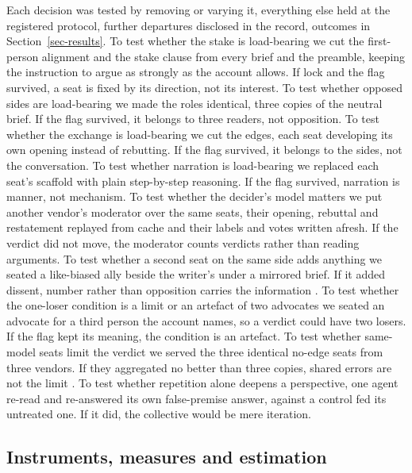 Each decision was tested by removing or varying it, everything else held
at the registered protocol, further departures disclosed in the record,
outcomes in
Section~\ref{sec-results}.
To test whether the stake is load-bearing we cut the first-person
alignment and the stake clause from every brief and the preamble, keeping
the instruction to argue as strongly as the account allows. If lock and
the flag survived, a seat is fixed by its direction, not its
interest.
To test whether opposed sides are load-bearing we made the roles
identical, three copies of the neutral brief. If the flag survived, it
belongs to three readers, not
opposition.
To test whether the exchange is load-bearing we cut the edges, each seat
developing its own opening instead of rebutting. If the flag survived, it
belongs to the sides, not the
conversation.
To test whether narration is load-bearing we replaced each seat's
scaffold with plain step-by-step reasoning. If the flag
survived, narration is manner, not
mechanism.
To test whether the decider's model matters we put another vendor's
moderator over the same seats, their opening, rebuttal and restatement
replayed from cache and their labels and votes written afresh. If the
verdict did not move, the moderator counts verdicts rather than reading
arguments.
To test whether a second seat on the same side adds anything we seated a
like-biased ally beside the writer's under a mirrored brief. If it added
dissent, number rather than opposition carries the information
\citep{krishna2001model}.
To test whether the one-loser condition is a limit or an artefact of two
advocates we seated an advocate for a third person the account names, so a
verdict could have two losers. If the flag kept its meaning, the
condition is an
artefact.
To test whether same-model seats limit the verdict we served the three
identical no-edge seats from three vendors. If they aggregated no better
than three copies, shared errors are not the limit
\citep{ladha1992condorcet}.
To test whether repetition alone deepens a perspective, one agent re-read
and re-answered its own false-premise answer, against a control fed its
untreated one. If it did, the collective would be mere
iteration.

\subsection{Instruments, measures and estimation}
\label{sec-method-instruments}
\label{sec-method-measures}
\label{sec-method-estimation}

